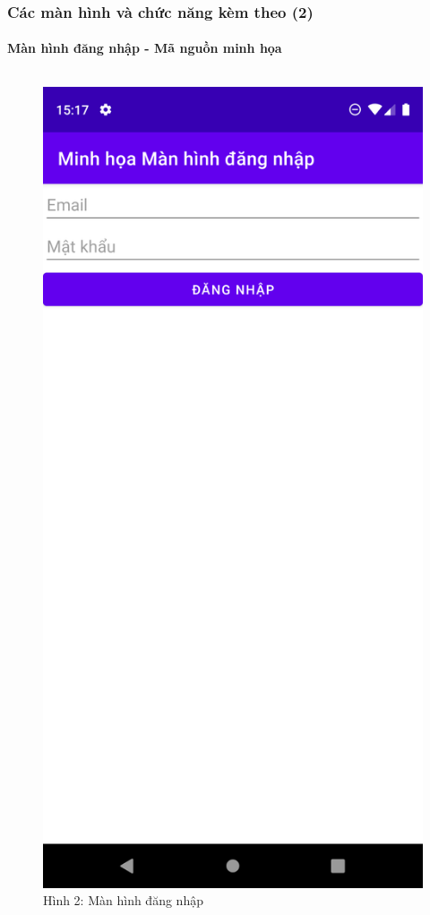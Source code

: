 \documentclass{beamer}
\begin{document}
\begin{frame}
    \frametitle{Các màn hình và chức năng kèm theo (2)}
    \framesubtitle{Màn hình đăng nhập - Mã nguồn minh họa}

    \begin{columns}
        \begin{figure}
            \centering
            \includegraphics[height=0.7\textheight]{images/24.png}
            \caption{\centering\tiny{Hình 2: Màn hình đăng nhập}}


\end{figure}
\end{columns}
\end{frame}
\end{document}
